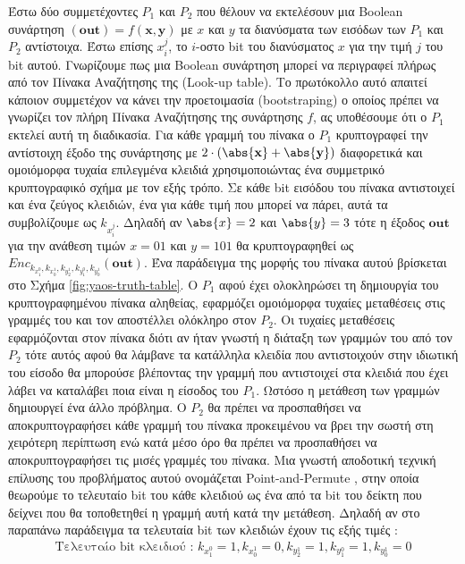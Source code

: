 Έστω δύο συμμετέχοντες $P_1$ και $P_2$ που θέλουν να εκτελέσουν μια Boolean συνάρτηση $(\mathbf{out}) = f(\mathbf{x}, \mathbf{y})$ με $x$ και $y$ τα διανύσματα των εισόδων των $P_1$ και $P_2$ αντίστοιχα. Έστω επίσης $x_i^j$, το $i$-οστο bit του διανύσματος $x$ για την τιμή $j$ του bit αυτού.  Γνωρίζουμε πως μια Boolean συνάρτηση μπορεί να περιγραφεί πλήρως από τον Πίνακα Αναζήτησης της (Look-up table). Το πρωτόκολλο αυτό απαιτεί κάποιον συμμετέχον να κάνει την προετοιμασία (bootstraping) ο οποίος πρέπει να γνωρίζει τον πλήρη Πίνακα Αναζήτησης της συνάρτησης $f$, ας υποθέσουμε ότι ο $P_1$ εκτελεί αυτή τη διαδικασία. Για κάθε γραμμή του πίνακα ο $P_1$ κρυπτογραφεί την αντίστοιχη έξοδο της συνάρτησης με $2 \cdot (\abs{\mathbf{x}} + \abs{\mathbf{y}})$ διαφορετικά και ομοιόμορφα τυχαία επιλεγμένα κλειδιά χρησιμοποιώντας ένα συμμετρικό κρυπτογραφικό σχήμα με τον εξής τρόπο. Σε κάθε bit εισόδου του πίνακα αντιστοιχεί και ένα ζεύγος κλειδιών, ένα για κάθε τιμή που μπορεί να πάρει, αυτά τα συμβολίζουμε ως $k_{x_i^j}$. Δηλαδή αν $\abs{x}=2$ και $\abs{y}=3$ τότε η έξοδος $\mathbf{out}$ για την ανάθεση τιμών $x=01$ και $y=101$ θα κρυπτογραφηθεί ως $Enc_{k_{x_1^0}, k_{x_0^1}, k_{y_2^1}, k_{y_1^0}, k_{y_0^1}}(\mathbf{out})$. Ένα παράδειγμα της μορφής του πίνακα αυτού βρίσκεται στο Σχήμα \ref{fig:yaos-truth-table}. Ο $P_1$ αφού έχει ολοκληρώσει τη δημιουργία του κρυπτογραφημένου πίνακα αληθείας, εφαρμόζει ομοιόμορφα τυχαίες μεταθέσεις στις γραμμές του και τον αποστέλλει ολόκληρο στον $P_2$. Οι τυχαίες μεταθέσεις εφαρμόζονται στον πίνακα διότι αν ήταν γνωστή η διάταξη των γραμμών του από τον $P_2$ τότε αυτός αφού θα λάμβανε τα κατάλληλα κλειδία που αντιστοιχούν στην ιδιωτική του είσοδο θα μπορούσε βλέποντας την γραμμή που αντιστοιχεί στα κλειδιά που έχει λάβει να καταλάβει ποια είναι η είσοδος του $P_1$. Ωστόσο η μετάθεση των γραμμών δημιουργεί ένα άλλο πρόβλημα. Ο $P_2$ θα πρέπει να προσπαθήσει να αποκρυπτογραφήσει κάθε γραμμή του πίνακα προκειμένου να βρει την σωστή στη χειρότερη περίπτωση ενώ κατά μέσο όρο θα πρέπει να προσπαθήσει να αποκρυπτογραφήσει τις μισές γραμμές του πίνακα. Μια γνωστή αποδοτική τεχνική επίλυσης του προβλήματος αυτού ονομάζεται Point-and-Permute , στην οποία θεωρούμε το τελευταίο bit του κάθε κλειδιού ως ένα από τα bit του δείκτη που δείχνει που θα τοποθετηθεί η γραμμή αυτή κατά την μετάθεση. Δηλαδή αν στο παραπάνω παράδειγμα τα τελευταία bit των κλειδιών έχουν τις εξής τιμές :
%
\begin{align*}
    \text{Τελευταίο bit κλειδιού : }k_{x_1^0} = 1, k_{x_0^1} = 0, k_{y_2^1} = 1, k_{y_1^0} = 1, k_{y_0^1} = 0
\end{align*}
